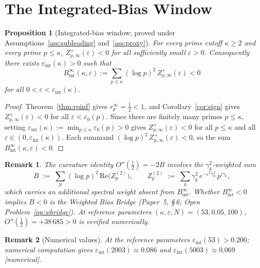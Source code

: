 \documentclass[11pt]{article}
\newtheorem{proposition}[theorem]{Proposition}
\newtheorem*{remark}{Remark}
\begin{document}
\section{The Integrated-Bias Window}
\label{sec:curv}

\begin{proposition}[Integrated-bias window; proved under
                    Assumptions~\ref{ass:subleading} and~\ref{ass:proxy}]
\label{prop:intbias}
For every prime cutoff $\kappa\ge 2$ and every prime $p\le\kappa$,
$Z_{p,\infty}^+(\varepsilon)<0$ for all sufficiently small $\varepsilon>0$.
Consequently there exists
$\varepsilon_{\mathrm{int}}(\kappa)>0$ such that
\[
B_{\mathrm{int}}^\infty(\kappa,\varepsilon)
  := \sum_{p\le\kappa}(\log p)^2\,Z_{p,\infty}^+(\varepsilon) < 0
\]
for all $0<\varepsilon<\varepsilon_{\mathrm{int}}(\kappa)$.
\end{proposition}

\begin{proof}
Theorem~\ref{thm:rpinf} gives $r_p^\infty=\tfrac12<1$, and
Corollary~\ref{cor:sign} gives $Z_{p,\infty}^+(\varepsilon)<0$ for all
$\varepsilon<\varepsilon_0(p)$.
Since there are finitely many primes $p\le\kappa$, setting
$\varepsilon_{\mathrm{int}}(\kappa):=\min_{p\le\kappa}\varepsilon_0(p)>0$ gives
$Z_{p,\infty}^+(\varepsilon)<0$ for all $p\le\kappa$ and all
$\varepsilon\in(0,\varepsilon_{\mathrm{int}}(\kappa))$.
Each summand $(\log p)^2\,Z_{p,\infty}^+(\varepsilon)<0$, so the
sum $B_{\mathrm{int}}^\infty(\kappa,\varepsilon)<0$.
\end{proof}

\begin{remark}
The curvature identity $O''(\tfrac12)=-2B$ involves the
$\gamma_k^2$-weighted sum
\[
B \;:=\; \sum_p(\log p)^2\,\mathrm{Re}\bigl(Z_p^{(2)}\bigr),
\qquad
Z_p^{(2)} \;:=\; \sum_k\gamma_k^2\,e^{-\varepsilon^2\gamma_k^2}\,p^{i\gamma_k},
\]
which carries an additional spectral weight absent from
$B_{\mathrm{int}}^\infty$.
Whether $B_{\mathrm{int}}^\infty<0$ implies $B<0$ is the
\emph{Weighted Bias Bridge} (Paper~5, \S\,6;
Open Problem~\ref{op:wbridge}).
At reference parameters $(\kappa,\varepsilon,N)=(53,0.05,100)$,
$O''(\tfrac12)=+38\,685>0$ is verified numerically.
\end{remark}

\begin{remark}[Numerical values]
At the reference parameters $\varepsilon_{\mathrm{int}}(53)>0.200$; numerical
computation gives $\varepsilon_{\mathrm{int}}(2003)\approx 0.086$ and
$\varepsilon_{\mathrm{int}}(5003)\approx 0.069$ [numerical].
\end{remark}
\end{document}
